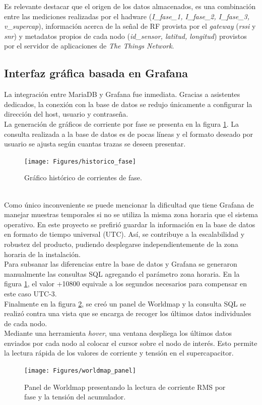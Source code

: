 Es relevante destacar que el origen de los datos almacenados, es una combinación entre las mediciones realizadas por el hadware (\textit{I\_fase\_1, I\_fase\_2, I\_fase\_3, v\_supercap}), información acerca de la señal de RF provista por el \textit{gateway} (\textit{rssi} y \textit{snr}) y metadatos propios de cada nodo (\textit{id\_sensor, latitud, longitud}) provistos por el servidor de aplicaciones de \textit{The Things Network}.\\

\subsection{Interfaz gráfica basada en Grafana}
La integración entre MariaDB y Grafana fue inmediata. Gracias a asistentes dedicados, la conexión con la base de datos se redujo únicamente a configurar la dirección del host, usuario y contraseña.\\
La generación de gráficos de corriente por fase se presenta en la figura \ref{fig:historicofase}. La consulta realizada a la base de datos es de pocas líneas y el formato deseado por usuario se ajusta seg\'{u}n cuantas trazas se deseen presentar.
\begin{figure}[h]
	\centering
	\texttt{[image: Figures/historico\_fase]}
	\caption{Gráfico histórico de corrientes de fase.}
	\label{fig:historicofase}
\end{figure}\\
Como único inconveniente se puede mencionar la dificultad que tiene Grafana de manejar muestras temporales si no se utiliza la misma zona horaria que el sistema operativo. En este proyecto se prefirió guardar la información en la base de datos en formato de tiempo universal (UTC). Así, se contribuye a la escalabilidad y robustez del producto, pudiendo desplegarse independientemente de la zona horaria de la instalación.\\
Para subsanar las diferencias entre la base de datos y Grafana se generaron manualmente las consultas SQL agregando el parámetro zona horaria. En la figura \ref{fig:historicofase}, el valor +10800 equivale a los segundos necesarios para compensar en este caso UTC-3.\\
Finalmente en la figura \ref{fig:worldmappanel}, se creó un panel de Worldmap y la consulta SQL se realizó contra una vista que se encarga de recoger los últimos datos individuales de cada nodo.\\
Mediante una herramienta \textit{hover}, una ventana despliega los últimos datos enviados por cada nodo al colocar el cursor sobre el nodo de interés. Esto permite la lectura rápida de los valores de corriente y tensión en el supercapacitor.\\
\vspace{130px}
\begin{figure}[h]
	\centering
	\texttt{[image: Figures/worldmap\_panel]}
	\caption{Panel de Worldmap presentando la lectura de corriente RMS por fase y la tensión del acumulador.}
	\label{fig:worldmappanel}
\end{figure}\\
